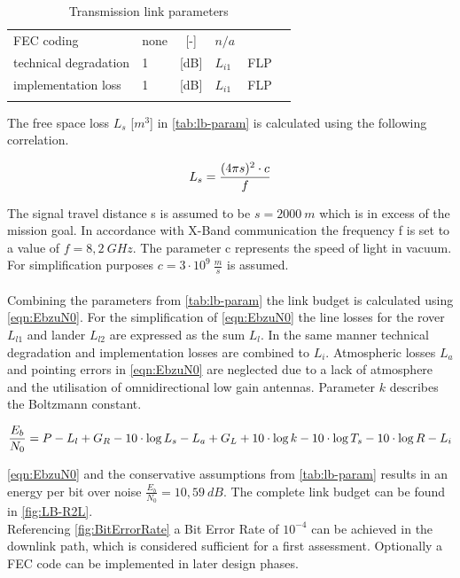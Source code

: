 \begin{table}[h]
\begin{tabular}{llclll}
FEC coding                       & none   & {[}-{]}    & ${n/a}$       &                              &  \\
technical degradation            & 1      & {[}dB{]}   & ${L}_{i1}$    & FLP                          &  \\
implementation loss              & 1      & {[}dB{]}   & ${L}_{i1}$	   & FLP                          &  \\
                                 &        &            &               &                              & 
\end{tabular}
\caption{Transmission link parameters}
\label{tab:lb-param}
\end{table}

The free space loss ${L}_{s}$ [$m^3$] in \autoref{tab:lb-param} is calculated using the following correlation. 

\begin{equation}
	\centering
		{L}_{s} = {\frac{(4 \pi s)^2 \cdot c}{f}}
	\label{eqn:Ls}
\end{equation}

The signal travel distance {s} is assumed to be $s = 2000\ m$ which is in excess of the mission goal. In accordance with X-Band communication the frequency {f} is set to a value of $f = 8,2\ GHz$. The parameter c represents the speed of light in vacuum. For simplification purposes $c = 3 \cdot 10^9\ \frac{m}{s}$ is assumed. \\ \\   
Combining the parameters from \autoref{tab:lb-param} the link budget is calculated using \autoref{eqn:EbzuN0}. For the simplification of \autoref{eqn:EbzuN0} the line losses for the rover ${L}_{l1}$ and lander ${L}_{l2}$ are expressed as the sum ${L}_{l}$. In the same manner technical degradation and implementation losses are combined to ${L}_{i}$. Atmospheric losses ${L}_{a}$ and pointing errors in \autoref{eqn:EbzuN0} are neglected due to a lack of atmosphere and the utilisation of omnidirectional low gain antennas. Parameter ${k}$ describes the Boltzmann constant.   

\begin{equation}
  \centering
		{\frac{{E}_{b}}{{N}_{0}}} = {P} - {L}_{l} + {G}_{R} - {10\cdot \log{{L}_{s}}} - {L}_{a} + {G}_{L} + {10\cdot \log{k}} - {10\cdot \log{{T}_{s}}} - {10\cdot \log{{R}}} - {L}_{i}
	\label{eqn:EbzuN0}
\end{equation}


\autoref{eqn:EbzuN0} and the conservative assumptions from \autoref{tab:lb-param} results in an energy per bit over noise $\frac{{E}_{b}}{{N}_{0}} = 10,59\ dB$. The complete link budget can be found in \autoref{fig:LB-R2L}. \\
Referencing \autoref{fig:BitErrorRate} a Bit Error Rate of $10^{-4}$ can be achieved in the downlink path, which is considered sufficient for a first assessment. Optionally a FEC code can be implemented in later design phases.\\

